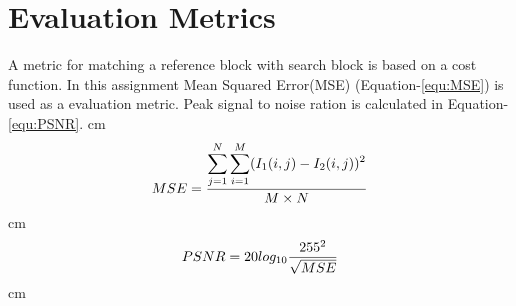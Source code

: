 \documentclass[]{article}
\begin{document}
\section{Evaluation Metrics}
	\justifying A metric for matching a reference block with search block is based on a cost function. In this assignment Mean Squared Error(MSE) (Equation-\ref{equ:MSE}) is used as a evaluation metric. Peak signal to noise ration is calculated in Equation-\ref{equ:PSNR}.
			 cm
			\begin{equation}
					\label{equ:MSE}
					\centering
					MSE=
					\frac{\displaystyle\sum_{j=1}^{N}\displaystyle\sum_{i=1}^{M}
					(I_{1}(i,j)-I_{2}(i,j))^{2}}{M \times N}
			\end{equation}
			 cm
			\begin{equation}
	 				\label{equ:PSNR}
	 				\centering
	 				PSNR = 20log_{10} \frac {255^2}{\sqrt{MSE}}
	 		\end{equation}
			 cm
\end{document}
